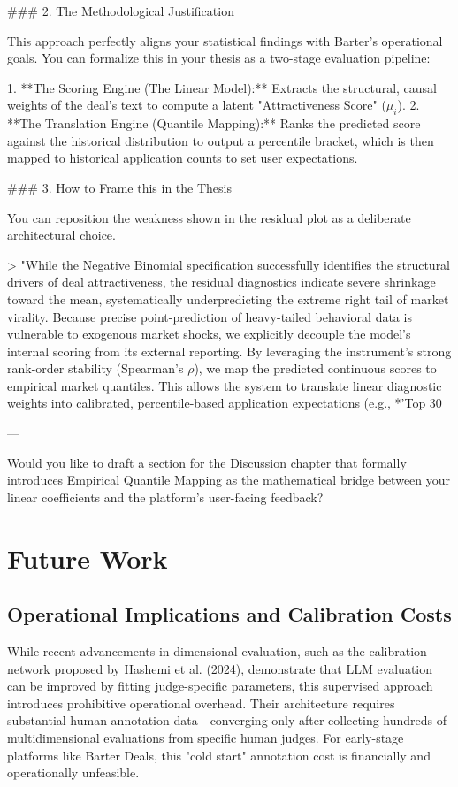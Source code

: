 ### 2. The Methodological Justification

This approach perfectly aligns your statistical findings with Barter's operational goals. You can formalize this in your thesis as a two-stage evaluation pipeline:

1. **The Scoring Engine (The Linear Model):** Extracts the structural, causal weights of the deal's text to compute a latent "Attractiveness Score" ($\mu_i$).
2. **The Translation Engine (Quantile Mapping):** Ranks the predicted score against the historical distribution to output a percentile bracket, which is then mapped to historical application counts to set user expectations.

### 3. How to Frame this in the Thesis

You can reposition the weakness shown in the residual plot as a deliberate architectural choice.

> "While the Negative Binomial specification successfully identifies the structural drivers of deal attractiveness, the residual diagnostics indicate severe shrinkage toward the mean, systematically underpredicting the extreme right tail of market virality. Because precise point-prediction of heavy-tailed behavioral data is vulnerable to exogenous market shocks, we explicitly decouple the model's internal scoring from its external reporting. By leveraging the instrument's strong rank-order stability (Spearman's $\rho$), we map the predicted continuous scores to empirical market quantiles. This allows the system to translate linear diagnostic weights into calibrated, percentile-based application expectations (e.g., *'Top 30%

---

Would you like to draft a section for the Discussion chapter that formally introduces Empirical Quantile Mapping as the mathematical bridge between your linear coefficients and the platform's user-facing feedback?


\section{Future Work}

\subsection{Operational Implications and Calibration Costs}

While recent advancements in dimensional evaluation, such as the calibration network proposed by Hashemi et al. (2024), demonstrate that LLM evaluation can be improved by fitting judge-specific parameters, this supervised approach introduces prohibitive operational overhead. Their architecture requires substantial human annotation data—converging only after collecting hundreds of multidimensional evaluations from specific human judges. For early-stage platforms like Barter Deals, this "cold start" annotation cost is financially and operationally unfeasible. 

